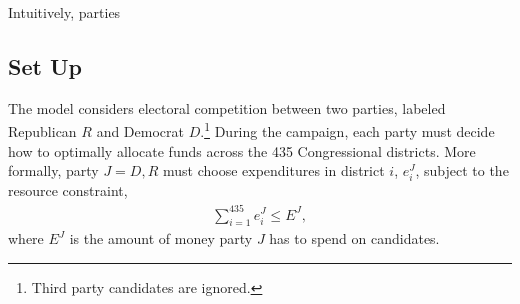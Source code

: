 \documentclass[12pt,final,fleqn]{article}
\theoremstyle{plain}
\begin{document}
Intuitively, parties 

\subsection{Set Up}
The model considers electoral competition between two parties, labeled Republican $R$ and Democrat $D$.\footnote{Third party candidates are ignored.} During the campaign, each party must decide how to optimally allocate funds across the 435 Congressional districts. More formally, party $J = D, R$ must choose expenditures in district $i$, $e^J_i$, subject to the resource constraint, 
\begin{align} \label{eqn: budget constraint}
\sum_{i=1}^{435} e^J_i \leq E^J,
\end{align}
where $E^J$ is the amount of money party $J$ has to spend on candidates.
\end{document}

